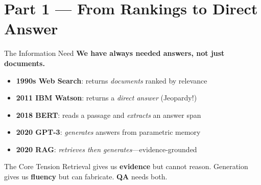 \documentclass[aspectratio=169, xcolor=table]{beamer}
\begin{document}

\section{Part 1 --- From Rankings to Direct Answer}

\begin{frame}[plain]
\sectionpage
\end{frame}

\begin{frame}{The Information Need}
\textbf{We have always needed answers, not just documents.}

\vspace{0.8em}
\begin{itemize}
  \item \textbf{1990s Web Search}: returns \emph{documents} ranked by relevance
  \item \textbf{2011 IBM Watson}: returns a \emph{direct answer} (Jeopardy!)
  \item \textbf{2018 BERT}: reads a passage and \emph{extracts} an answer span
  \item \textbf{2020 GPT-3}: \emph{generates} answers from parametric memory
  \item \textbf{2020 RAG}: \emph{retrieves then generates}---evidence-grounded
\end{itemize}

\vspace{0.3em}
\begin{block}{The Core Tension}
\small
Retrieval gives us \textbf{evidence} but cannot reason. Generation gives us \textbf{fluency} but can fabricate. \textbf{QA} needs both.
\end{block}
\end{frame}
\end{document}
